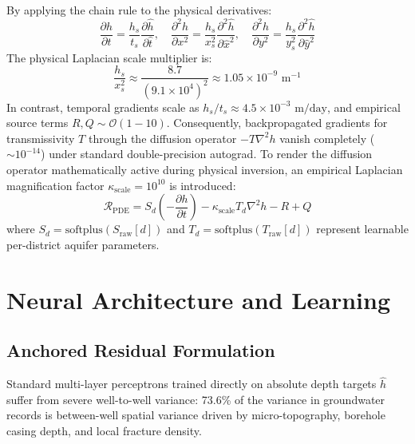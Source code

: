 \documentclass[10pt,conference,letterpaper]{IEEEtran}
\begin{document}
By applying the chain rule to the physical derivatives:
\begin{equation}
\frac{\partial h}{\partial t} = \frac{h_s}{t_s} \frac{\partial \hat{h}}{\partial \hat{t}}, \quad \frac{\partial^2 h}{\partial x^2} = \frac{h_s}{x_s^2} \frac{\partial^2 \hat{h}}{\partial \hat{x}^2}, \quad \frac{\partial^2 h}{\partial y^2} = \frac{h_s}{y_s^2} \frac{\partial^2 \hat{h}}{\partial \hat{y}^2}
\end{equation}
The physical Laplacian scale multiplier is:
\begin{equation}
\frac{h_s}{x_s^2} \approx \frac{8.7}{(9.1 \times 10^4)^2} \approx 1.05 \times 10^{-9} \text{ m}^{-1}
\end{equation}
In contrast, temporal gradients scale as $h_s / t_s \approx 4.5 \times 10^{-3}\text{ m/day}$, and empirical source terms $R, Q \sim \mathcal{O}(1 - 10)$. Consequently, backpropagated gradients for transmissivity $T$ through the diffusion operator $-T \nabla^2 h$ vanish completely ($\sim 10^{-14}$) under standard double-precision autograd. To render the diffusion operator mathematically active during physical inversion, an empirical Laplacian magnification factor $\kappa_{\text{scale}} = 10^{10}$ is introduced:
\begin{equation}
\mathcal{R}_{\text{PDE}} = S_d \left( -\frac{\partial h}{\partial t} \right) - \kappa_{\text{scale}} T_d \nabla^2 h - R + Q
\label{eq:residual_scaled}
\end{equation}
where $S_d = \text{softplus}(S_{\text{raw}}[d])$ and $T_d = \text{softplus}(T_{\text{raw}}[d])$ represent learnable per-district aquifer parameters.

\section{Neural Architecture and Learning}

\subsection{Anchored Residual Formulation}
Standard multi-layer perceptrons trained directly on absolute depth targets $\hat{h}$ suffer from severe well-to-well variance: 73.6\% of the variance in groundwater records is between-well spatial variance driven by micro-topography, borehole casing depth, and local fracture density.
\end{document}
